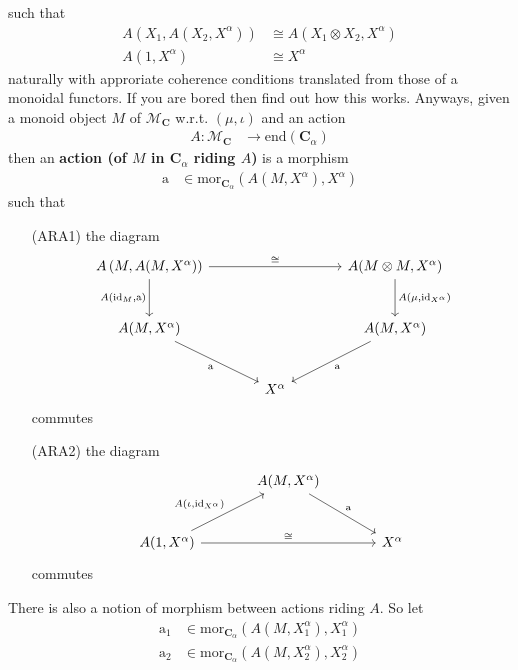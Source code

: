 such that
\begin{align*}
  A
  \left(
    X_{1},
    A(X_{2},X^{\alpha})
  \right)
  &\cong
  A
  \left(
    X_{1}
    \otimes
    X_{2},
    X^{\alpha}
  \right)
  \\
  A(1,X^{\alpha})
  &\cong
  X^{\alpha}
\end{align*}
naturally with approriate coherence conditions translated from those of a monoidal functors. If you are bored then find out how this works. Anyways, given a monoid object $M$ of $\mathcal{M}_{\mathbf{C}}$ w.r.t. $(\mu,\iota)$ and an action
\begin{align*}
  A
  \colon
  \mathcal{M}_{\mathbf{C}}
  &\rightarrow
  \mathrm{end}(\mathbf{C}_{\alpha})
\end{align*}
then an \textbf{action (of $M$ in $\mathbf{C}_{\alpha}$ riding $A$)} is a morphism
\begin{align*}
  \mathrm{a}
  &\in
  \mathrm{mor}_{\mathbf{C}_{\alpha}}
  \left(
    A(M,X^{\alpha}),
    X^{\alpha}
  \right)
\end{align*}
such that
\begin{enumerate}
\item[(ARA1)]
the diagram
\[
\begin{tikzcd}[sep=large]
  A
  \left(
    M,
    A(M,X^{\alpha})
  \right)
  \arrow{rr}{\cong}
  \arrow[swap]{d}{A(\mathrm{id}_{M},\mathrm{a})}
  &
  &
  A(M \otimes M,X^{\alpha})
  \arrow{d}{A(\mu,\mathrm{id}_{X^{\alpha}})}
  \\
  A(M,X^{\alpha})
  \arrow[swap]{dr}{\mathrm{a}}
  &
  &
  A(M,X^{\alpha})
  \arrow{dl}{\mathrm{a}}
  \\
  &
  X^{\alpha}
  &
\end{tikzcd}
\]
commutes
\item[(ARA2)]
the diagram
\[
\begin{tikzcd}[sep=large]
  &
  A(M,X^{\alpha})
  \arrow{dr}{\mathrm{a}}
  &
  \\
  A(1,X^{\alpha})
  \arrow{ur}{A(\iota,\mathrm{id}_{X^{\alpha}})}
  \arrow{rr}{\cong}
  &
  &
  X^{\alpha}
\end{tikzcd}
\]
commutes
\end{enumerate}
There is also a notion of morphism between actions riding $A$. So let
\begin{align*}
  \mathrm{a}_{1}
  &\in
  \mathrm{mor}_{\mathbf{C}_{\alpha}}
  \left(
    A(M,X_{1}^{\alpha}),
    X_{1}^{\alpha}
  \right)
  \\
  \mathrm{a}_{2}
  &\in
  \mathrm{mor}_{\mathbf{C}_{\alpha}}
  \left(
    A(M,X_{2}^{\alpha}),
    X_{2}^{\alpha}
  \right)
\end{align*}
